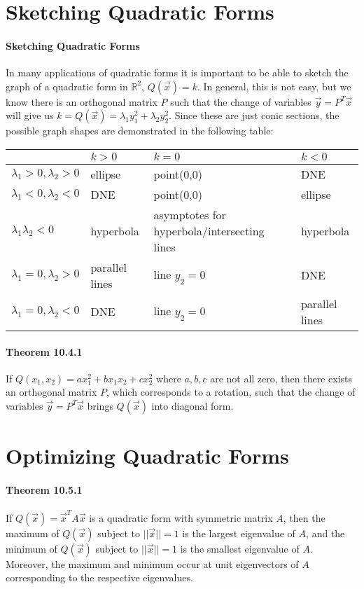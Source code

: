 \documentclass[10pt,letter]{article}
\begin{document}
\section*{Sketching Quadratic Forms}
\paragraph{Sketching Quadratic Forms}
In many applications of quadratic forms it is important to be able to sketch the graph of a quadratic form in $\mathbb{R}^2$, $Q(\vec{x})=k$. In general, this is not easy, but we know there is an orthogonal matrix $P$ such that the change of variables $\vec{y}=P^T\vec{x}$ will give us $k=Q(\vec{x})=\lambda_1y_1^2+\lambda_2y_2^2$. Since these are just conic sections, the possible graph shapes are demonstrated in the following table: 
\begin{table}[!h]
\begin{tabular}{|l|l|l|l|}
\hline
 &  $k>0$ & $k=0$ & $k<0$ \\ \hline
$\lambda_1>0,\lambda_2>0$ & ellipse & point(0,0) & DNE \\ \hline
$\lambda_1<0,\lambda_2<0$ & DNE & point(0,0) & ellipse \\ \hline
$\lambda_1\lambda_2<0$ & hyperbola & asymptotes for hyperbola/intersecting lines & hyperbola \\ \hline
$\lambda_1=0,\lambda_2>0$ & parallel lines & line $y_2=0$ & DNE \\ \hline
$\lambda_1=0,\lambda_2<0$ & DNE & line $y_2=0$ & parallel lines \\ \hline
\end{tabular}
\end{table}

\paragraph{Theorem 10.4.1}
If $Q(x_1,x_2)=ax_1^2+bx_1x_2+cx_2^2$ where $a,b,c$ are not all zero, then there exists an orthogonal matrix $P$, which corresponds to a rotation, such that the change of variables $\vec{y}=P^T\vec{x}$ brings $Q(\vec{x})$ into diagonal form. 

\section*{Optimizing Quadratic Forms}
\paragraph{Theorem 10.5.1}
If $Q(\vec{x})=\vec{x}^TA\vec{x}$ is a quadratic form with symmetric matrix $A$, then the maximum of $Q(\vec{x})$ subject to $||\vec{x}||=1$ is the largest eigenvalue of $A$, and the minimum of $Q(\vec{x})$ subject to $||\vec{x}||=1$ is the smallest eigenvalue of $A$. Moreover, the maximum and minimum occur at unit eigenvectors of $A$ corresponding to the respective eigenvalues. 
\end{document}
